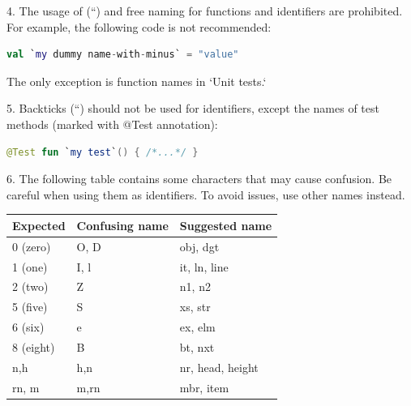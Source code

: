 4.	The usage of (``) and free naming for functions and identifiers are prohibited. For example, the following code is not recommended:



\begin{lstlisting}[language=Kotlin]
val `my dummy name-with-minus` = "value" 
\end{lstlisting}


The only exception is function names in `Unit tests.`



5.	Backticks (``) should not be used for identifiers, except the names of test methods (marked with @Test annotation):

\begin{lstlisting}[language=Kotlin]
 @Test fun `my test`() { /*...*/ }
\end{lstlisting}
6.  The following table contains some characters that may cause confusion. Be careful when using them as identifiers. To avoid issues, use other names instead.

\begin{center}

\begin{tabular}{ |p{}|p{}|p{}| }

\hline

Expected&Confusing name&Suggested name\\

\hline

 0 (zero)      & O, D                     & obj, dgt         \\

 1 (one)       & I, l                     & it, ln, line     \\

 2 (two)       & Z                        & n1, n2           \\

 5 (five)      & S                        & xs, str          \\

 6 (six)       & e                        & ex, elm          \\

 8 (eight)     & B                        & bt, nxt          \\

 n,h           & h,n                      & nr, head, height \\

 rn, m         & m,rn                     & mbr, item        \\

\hline

\end{tabular}

\end{center}

